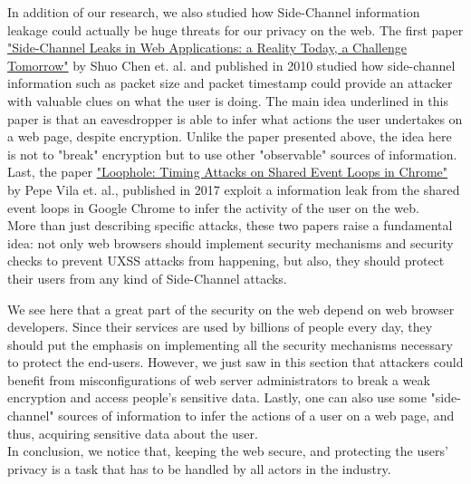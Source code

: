 \documentclass[journal]{IEEEtran}
\begin{document}
In addition of our research, we also studied how Side-Channel information leakage could actually be huge threats for our privacy on the web. The first paper \ul{"Side-Channel Leaks in Web Applications: a Reality Today, a Challenge Tomorrow"} by Shuo Chen et. al. and published in 2010 studied how side-channel information such as packet size and packet timestamp could provide an attacker with valuable clues on what the user is doing. The main idea underlined in this paper is that an eavesdropper is able to infer what actions the user undertakes on a web page, despite encryption. Unlike the paper presented above, the idea here is not to "break" encryption but to use other "observable" sources of information. \\
Last, the paper \ul{"Loophole: Timing Attacks on Shared Event Loops in Chrome"} by Pepe Vila et. al., published in 2017 exploit a information leak from the shared event loops in Google Chrome to infer the activity of the user on the web. \\
More than just describing specific attacks, these two papers raise a fundamental idea: not only web browsers should implement security mechanisms and security checks to prevent UXSS attacks from happening, but also, they should protect their users from any kind of Side-Channel attacks.

\medskip

We see here that a great part of the security on the web depend on web browser developers. Since their services are used by billions of people every day, they should put the emphasis on implementing all the security mechanisms necessary to protect the end-users. However, we just saw in this section that attackers could benefit from misconfigurations of web server administrators to break a weak encryption and access people's sensitive data. Lastly, one can also use some "side-channel" sources of information to infer the actions of a user on a web page, and thus, acquiring sensitive data about the user. \\
In conclusion, we notice that, keeping the web secure, and protecting the users' privacy is a task that has to be handled by all actors in the industry.
\end{document}
